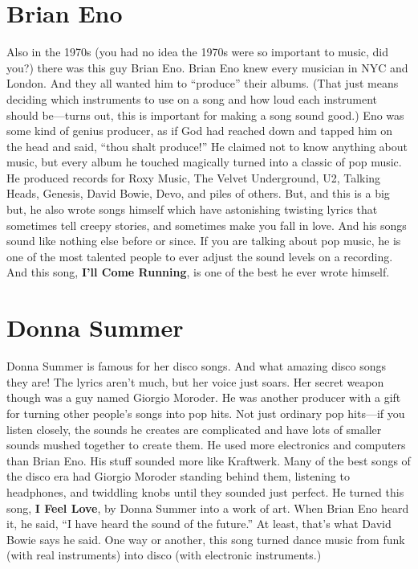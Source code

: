 \documentclass[letterpaper,single]{article}
\begin{document}
\section{Brian Eno}
Also in the 1970s (you had no idea the 1970s were so important to music, did you?) there was this guy Brian Eno. 
Brian Eno knew every musician in NYC and London. 
And they all wanted him to ``produce'' their albums. 
(That just means deciding which instruments to use on a song and how loud each instrument should be---turns out, this is important for making a song sound good.) 
Eno was some kind of genius producer, as if God had reached down and tapped him on the head and said, ``thou shalt produce!''
He claimed not to know anything about music, but every album he touched magically turned into a classic of pop music. 
He produced records for Roxy Music, The Velvet Underground, U2, Talking Heads, Genesis, David Bowie, Devo, and piles of others. 
But, and this is a big but, he also wrote songs himself which have astonishing twisting lyrics that sometimes tell creepy stories, and sometimes make you fall in love. 
And his songs sound like nothing else before or since. 
If you are talking about pop music, he is one of the most talented people to ever adjust the sound levels on a recording.
And this song, \textbf{I'll Come Running}, is one of the best he ever wrote himself.

\section{Donna Summer}
Donna Summer is famous for her disco songs. 
And what amazing disco songs they are! 
The lyrics aren't much, but her voice just soars. 
Her secret weapon though was a guy named Giorgio Moroder. 
He was another producer with a gift for turning other people's songs into pop hits. 
Not just ordinary pop hits---if you listen closely, the sounds he creates are complicated and have lots of smaller sounds mushed together to create them.
He used more electronics and computers than Brian Eno. 
His stuff sounded more like Kraftwerk. 
Many of the best songs of the disco era had Giorgio Moroder standing behind them, listening to headphones, and twiddling knobs until they sounded just perfect.
He turned this song, \textbf{I Feel Love}, by Donna Summer into a work of art. 
When Brian Eno heard it, he said, ``I have heard the sound of the future.'' 
At least, that's what David Bowie says he said. 
One way or another, this song turned dance music from funk (with real instruments) into disco (with electronic instruments.)
\end{document}
